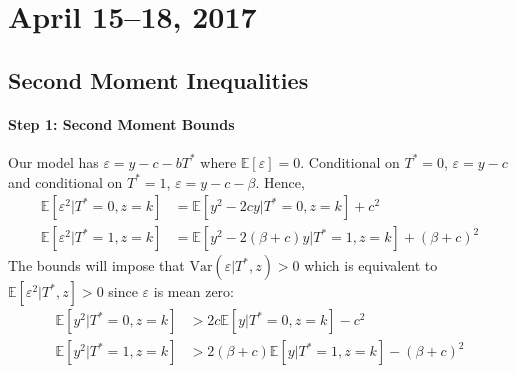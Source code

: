 \documentclass[12pt]{article}
\begin{document}
\section{April 15--18, 2017}
 
\subsection*{Second Moment Inequalities}

\paragraph{Step 1: Second Moment Bounds}
Our model has $\varepsilon = y - c - bT^*$ where $\mathbb{E}[\varepsilon]=0$.
Conditional on $T^*=0$, $\varepsilon = y-c$ and conditional on $T^*=1$, $\varepsilon = y - c -\beta$.
Hence,
\begin{align*}
  \mathbb{E}\left[ \varepsilon^2| T^*=0, z=k\right] &= \mathbb{E}\left[ y^2 - 2cy|T^*=0, z=k \right] + c^2\\
  \mathbb{E}\left[ \varepsilon^2| T^*=1, z=k\right] &= \mathbb{E}\left[ y^2 - 2(\beta + c)y|T^*=1, z=k \right] + (\beta + c)^2
\end{align*}
The bounds will impose that $\mbox{Var}(\varepsilon|T^*,z)>0$ which is equivalent to $\mathbb{E}\left[ \varepsilon^2|T^*,z \right]>0$ since $\varepsilon$ is mean zero:
\begin{align*}
  \mathbb{E}\left[ y^2|T^*=0, z=k \right]&> 2c \mathbb{E}\left[ y|T^*=0, z=k \right] - c^2\\
  \mathbb{E}\left[ y^2|T^*=1, z=k \right]&> 2(\beta + c) \mathbb{E}\left[ y|T^*=1, z=k \right] - (\beta + c)^2
\end{align*}

\end{document}
